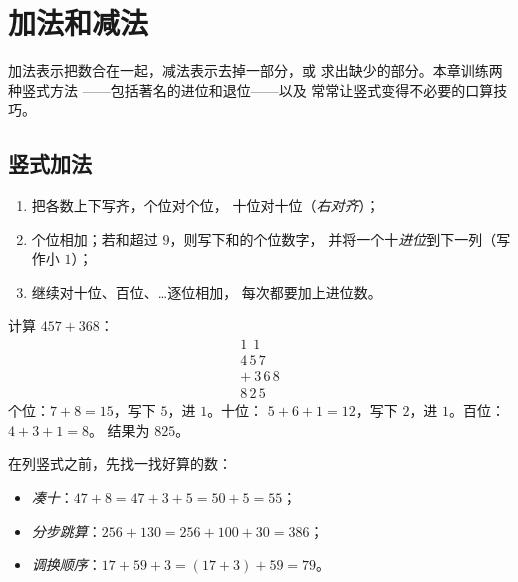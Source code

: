 \chapter{加法和减法}\label{ch:g3:addsub}

加法表示把数合在一起，减法表示去掉一部分，或
求出缺少的部分。本章训练两种竖式方法
——包括著名的进位和退位——以及
常常让竖式变得不必要的口算技巧。

\section{竖式加法}

\begin{method}[竖式加法]\label{met:g3:addsub:add}
\begin{enumerate}
  \item 把各数上下写齐，个位对个位，
        十位对十位（\emph{右对齐}）；
  \item 个位相加；若和超过 $9$，则写下和的个位数字，
        并将一个十\emph{进位}到下一列（写作小 $1$）；
  \item 继续对十位、百位、\dots 逐位相加，
        每次都要加上进位数。
\end{enumerate}
\end{method}

\begin{example}\label{ex:g3:addsub:add}
计算 $457 + 368$：
\[
\begin{array}{r}
{\scriptstyle 1}\ \ {\scriptstyle 1}\ \ \phantom{0} \\[-3pt]
4\,5\,7 \\
+\ 3\,6\,8 \\
\hline
8\,2\,5
\end{array}
\]
个位：$7 + 8 = 15$，写下 $5$，进 $1$。十位：
$5 + 6 + 1 = 12$，写下 $2$，进 $1$。百位：$4 + 3 + 1 = 8$。
结果为 $825$。
\end{example}

\begin{example}[口算加法]\label{ex:g3:addsub:mental}
在列竖式之前，先找一找好算的数：
\begin{itemize}
  \item \emph{凑十}：$47 + 8 = 47 + 3 + 5 = 50 + 5 = 55$；
  \item \emph{分步跳算}：$256 + 130 = 256 + 100 + 30 = 386$；
  \item \emph{调换顺序}：$17 + 59 + 3 = (17 + 3) + 59 = 79$。
\end{itemize}
\end{example}

